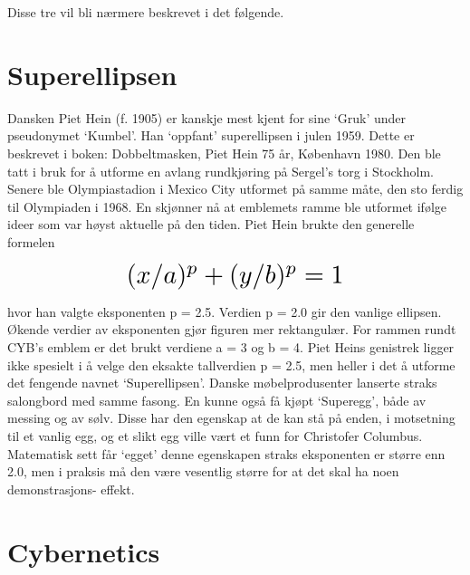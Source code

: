 \documentclass[../../main.tex]{subfiles}
\begin{document}
Disse tre vil bli nærmere beskrevet i det følgende.


\section{Superellipsen}

Dansken Piet Hein (f. 1905) er kanskje mest kjent for sine `Gruk' under pseudonymet `Kumbel'. Han `oppfant' superellipsen i julen 1959. Dette er beskrevet i boken: Dobbeltmasken, Piet Hein 75 år, København 1980. Den ble tatt i bruk for å utforme en avlang rundkjøring på Sergel's torg i Stockholm. Senere ble Olympiastadion i Mexico City utformet på samme måte, den sto ferdig til Olympiaden i 1968. En skjønner nå at emblemets ramme ble utformet ifølge ideer som var høyst aktuelle på den tiden. Piet Hein brukte den generelle formelen

\[ \scalebox{2}{$(x / a)^p + (y / b)^p = 1$} \]

hvor han valgte eksponenten p = 2.5. Verdien p = 2.0 gir den vanlige ellipsen. Økende verdier av eksponenten gjør figuren mer rektangulær. For rammen rundt CYB's emblem er det brukt verdiene a = 3 og b = 4. Piet Heins genistrek ligger ikke spesielt i å velge den eksakte tallverdien p = 2.5, men heller i det å utforme det fengende navnet `Superellipsen'. Danske møbelprodusenter lanserte straks salongbord med samme fasong. En kunne også få kjøpt `Superegg', både av messing og av sølv. Disse har den egenskap at de kan stå på enden, i motsetning til et vanlig egg, og et slikt egg ville vært et funn for Christofer Columbus. Matematisk sett får `egget' denne egenskapen straks eksponenten er større enn 2.0, men i praksis må den være vesentlig større for at det skal ha noen demonstrasjons- effekt.

\section{Cybernetics}
\end{document}
